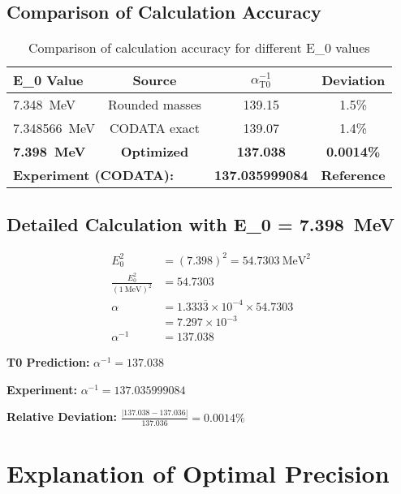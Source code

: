\documentclass[12pt,a4paper]{article}
\theoremstyle{definition}
\begin{document}
	\subsection{Comparison of Calculation Accuracy}
	
	\begin{table}[h]
		\centering
		\begin{tabular}{@{}lccc@{}}
			\toprule
			\textbf{E\_0 Value} & \textbf{Source} & \textbf{$\alpha^{-1}_{\text{T0}}$} & \textbf{Deviation} \\
			\midrule
			\SI{7.348}{\MeV} & Rounded masses & 139.15 & 1.5\% \\
			\SI{7.348566}{\MeV} & CODATA exact & 139.07 & 1.4\% \\
			\textbf{\SI{7.398}{\MeV}} & \textbf{Optimized} & \textbf{137.038} & \textbf{0.0014\%} \\
			\midrule
			\multicolumn{2}{l}{\textbf{Experiment (CODATA):}} & \textbf{137.035999084} & \textbf{Reference} \\
			\bottomrule
		\end{tabular}
		\caption{Comparison of calculation accuracy for different E\_0 values}
	\end{table}
	
	\subsection{Detailed Calculation with E\_0 = \SI{7.398}{\MeV}}
	
	\begin{align}
		E_0^2 &= (7.398)^2 = \SI{54.7303}{\MeV\squared} \\
		\frac{E_0^2}{( \SI{1}{\MeV} )^2} &= 54.7303 \\
		\alpha &= 1.333\overline{3} \times 10^{-4} \times 54.7303 \\
		&= 7.297 \times 10^{-3} \\
		\alpha^{-1} &= 137.038
	\end{align}
	
	\begin{tcolorbox}[colback=green!5!white,colframe=green!75!black,title=Excellent Agreement]
		\textbf{T0 Prediction:} $\alpha^{-1} = 137.038$
		
		\textbf{Experiment:} $\alpha^{-1} = 137.035999084$
		
		\textbf{Relative Deviation:} $\frac{|137.038 - 137.036|}{137.036} = 0.0014\%$
	\end{tcolorbox}
	
	\section{Explanation of Optimal Precision}
	
\end{document}
